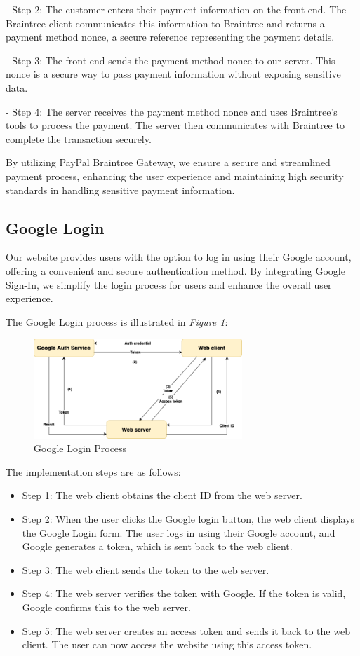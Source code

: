 - Step 2:
The customer enters their payment information on the front-end. The Braintree client communicates this information to Braintree and returns a payment method nonce, a secure reference representing the payment details.

- Step 3:
The front-end sends the payment method nonce to our server. This nonce is a secure way to pass payment information without exposing sensitive data.

- Step 4:
The server receives the payment method nonce and uses Braintree's tools to process the payment. The server then communicates with Braintree to complete the transaction securely.

By utilizing PayPal Braintree Gateway, we ensure a secure and streamlined payment process, enhancing the user experience and maintaining high security standards in handling sensitive payment information.

\subsection{Google Login}
Our website provides users with the option to log in using their Google account, 
offering a convenient and secure authentication method. By integrating Google Sign-In, 
we simplify the login process for users and enhance the overall user experience. 

The Google Login process is illustrated in \emph{Figure \ref{fig:gglogin-flow}}:
\begin{figure}[H]
    \centering
    \includegraphics[width=0.7\textwidth]{Figures/Implementation/GoogleLogin.png}
    \caption{Google Login Process}
    \label{fig:gglogin-flow}
\end{figure}

The implementation steps are as follows:
\begin{itemize}
    \item Step 1: The web client obtains the client ID from the web server.
    \item Step 2: When the user clicks the Google login button, the web client displays the Google Login form. The user logs in using their Google account, and Google generates a token, which is sent back to the web client.
    \item Step 3: The web client sends the token to the web server.
    \item Step 4: The web server verifies the token with Google. If the token is valid, Google confirms this to the web server.
    \item Step 5: The web server creates an access token and sends it back to the web client. The user can now access the website using this access token.
\end{itemize}

